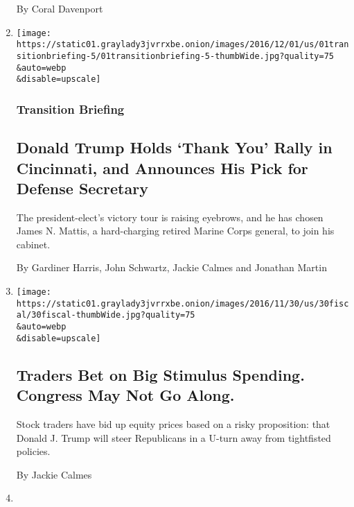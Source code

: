 \begin{enumerate}
  By Coral Davenport
\item
  \href{/2016/12/01/us/politics/donald-trump-transition.html}{}

  \texttt{[image: https://static01.graylady3jvrrxbe.onion/images/2016/12/01/us/01transitionbriefing-5/01transitionbriefing-5-thumbWide.jpg?quality=75\\\&auto=webp\\\&disable=upscale]}

  \hypertarget{transition-briefing}{%
  \subsubsection{Transition Briefing}\label{transition-briefing}}

  \hypertarget{donald-trump-holds-thank-you-rally-in-cincinnati-and-announces-his-pick-for-defense-secretary}{%
  \subsection{Donald Trump Holds `Thank You' Rally in Cincinnati, and
  Announces His Pick for Defense
  Secretary}\label{donald-trump-holds-thank-you-rally-in-cincinnati-and-announces-his-pick-for-defense-secretary}}

  The president-elect's victory tour is raising eyebrows, and he has
  chosen James N. Mattis, a hard-charging retired Marine Corps general,
  to join his cabinet.

  By Gardiner Harris, John Schwartz, Jackie Calmes and Jonathan Martin
\item
  \href{/2016/11/29/us/politics/traders-bet-on-tax-cuts-and-new-spending-congress-may-not-go-along.html}{}

  \texttt{[image: https://static01.graylady3jvrrxbe.onion/images/2016/11/30/us/30fiscal/30fiscal-thumbWide.jpg?quality=75\\\&auto=webp\\\&disable=upscale]}

  \hypertarget{traders-bet-on-big-stimulus-spending-congress-may-not-go-along}{%
  \subsection{Traders Bet on Big Stimulus Spending. Congress May Not Go
  Along.}\label{traders-bet-on-big-stimulus-spending-congress-may-not-go-along}}

  Stock traders have bid up equity prices based on a risky proposition:
  that Donald J. Trump will steer Republicans in a U-turn away from
  tightfisted policies.

  By Jackie Calmes
\item
  \href{/2016/11/15/us/politics/donald-trump-presidency.html}{}


\end{enumerate}

